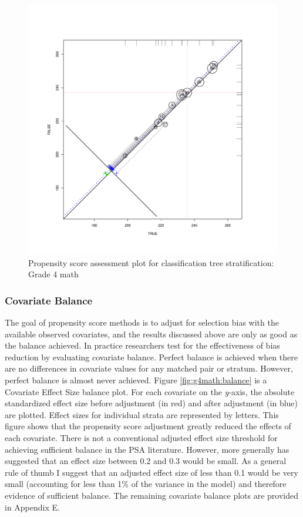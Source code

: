 \documentclass[letterpaper,12p,twoside]{article} %
\begin{document}
\begin{figure}[t]
\begin{center}
\includegraphics[width=\textwidth]{../Figures2009/g4math-circpsa-tree.pdf}
\caption{Propensity score assessment plot for classification tree stratification: Grade 4 math}
\label{fig:g4math:circpsa:tree}
\end{center}
\end{figure}

\subsubsection{Covariate Balance}

The goal of propensity score methods is to adjust for selection bias with the available observed covariates, and the results discussed above are only as good as the balance achieved. In practice researchers test for the effectiveness of bias reduction by evaluating covariate balance. Perfect balance is achieved when there are no differences in covariate values for any matched pair or stratum. However, perfect balance is almost never achieved. Figure \ref{fig:g4math:balance} is a Covariate Effect Size balance plot. For each covariate on the \textit{y}-axis, the absolute standardized effect size before adjustment (in red) and after adjustment (in blue) are plotted. Effect sizes for individual strata are represented by letters. This figure shows that the propensity score adjustment greatly reduced the effects of each covariate. There is not a conventional adjusted effect size threshold for achieving sufficient balance in the PSA literature. However, more generally  has suggested that an effect size between 0.2 and 0.3 would be small. As a general rule of thumb I suggest that an adjusted effect size of less than 0.1 would be very small (accounting for less than 1\% of the variance in the model) and therefore evidence of sufficient balance. The remaining covariate balance plots are provided in Appendix E.
\end{document}
